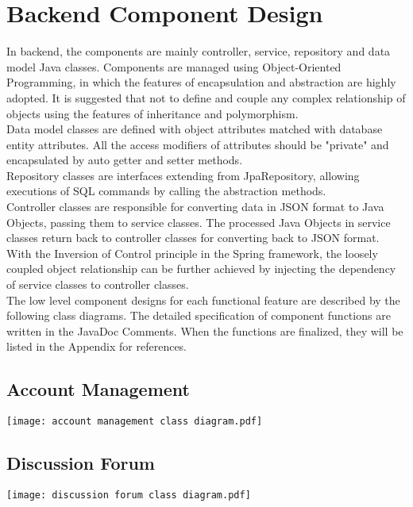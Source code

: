 \documentclass[11pt, a4paper]{article}
\begin{document}
\section{Backend Component Design}
In backend, the components are mainly controller, service, repository and data model Java classes. Components are managed using Object-Oriented Programming, in which the features of encapsulation and abstraction are highly adopted. It is suggested that not to define and couple any complex relationship of objects using the features of inheritance and polymorphism.\\

Data model classes are defined with object attributes matched with database entity attributes. All the access modifiers of attributes should be "private" and encapsulated by auto getter and setter methods. \\

Repository classes are interfaces extending from JpaRepository, allowing executions of SQL commands by calling the abstraction methods. \\

Controller classes are responsible for converting data in JSON format to Java Objects, passing them to service classes. The processed Java Objects in service classes return back to controller classes for converting back to JSON format. With the Inversion of Control principle in the Spring framework, the loosely coupled object relationship can be further achieved by injecting the dependency of service classes to controller classes. \\

The low level component designs for each functional feature are described by the following class diagrams. The detailed specification of component functions are written in the JavaDoc Comments. When the functions are finalized, they will be listed in the Appendix for references.
\subsection{Account Management}
\begin{center}
    \texttt{[image: account management class diagram.pdf]}
\end{center}
\subsection{Discussion Forum}
\begin{center}
    \texttt{[image: discussion forum class diagram.pdf]}
\end{center}
\end{document}
